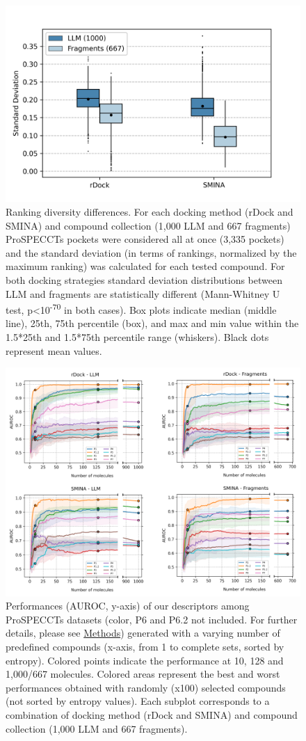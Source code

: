 \begin{figure}[htbp]
  \centering
  \includegraphics[width=0.55\linewidth]{figures/PocketVec/Supplementary/FigS6.png}
  \caption{
  Ranking diversity differences. For each docking method (rDock and SMINA) and compound collection (1,000 LLM and 667 fragments) ProSPECCTs pockets were considered all at once (3,335 pockets) and the standard deviation (in terms of rankings, normalized by the maximum ranking) was calculated for each tested compound. For both docking strategies standard deviation distributions between LLM and fragments are statistically different (Mann-Whitney U test, p<10\textsuperscript{-70} in both cases). Box plots indicate median (middle line), 25th, 75th percentile (box), and max and min value within the 1.5*25th and 1.5*75th percentile range (whiskers). Black dots represent mean values.
  }
  \label{PocketVec_FigS6}
\end{figure}


\begin{figure}[htbp]
  \centering
  \includegraphics[width=1\linewidth]{figures/PocketVec/Supplementary/FigS7.png}
  \caption{
  Performances (AUROC, y-axis) of our descriptors among ProSPECCTs datasets (color, P6 and P6.2 not included. For further details, please see \hyperref[PocketVec_Methods]{Methods}) generated with a varying number of predefined compounds (x-axis, from 1 to complete sets, sorted by entropy). Colored points indicate the performance at 10, 128 and 1,000/667 molecules. Colored areas represent the best and worst performances obtained with randomly (x100) selected compounds (not sorted by entropy values). Each subplot corresponds to a combination of docking method (rDock and SMINA) and compound collection (1,000 LLM and 667 fragments).   
  }
  \label{PocketVec_FigS7}
\end{figure}

